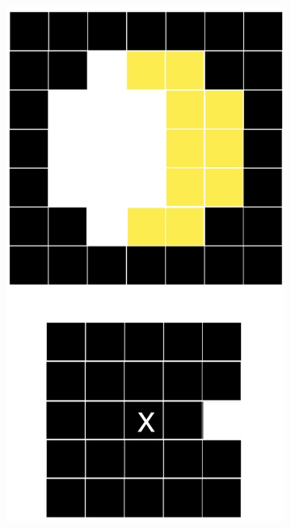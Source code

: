 \documentclass[tikz,14pt,fleqn]{article}
\begin{document}
\begin{figure}[h!]
\begin{subfigure}[b]{0.195\linewidth}
        \includegraphics[width=\linewidth]{fig/4.er3.png}
    \end{subfigure}
    \begin{subfigure}[b]{0.195\linewidth}
        \centering

\end{subfigure}
\end{figure}
\end{document}
